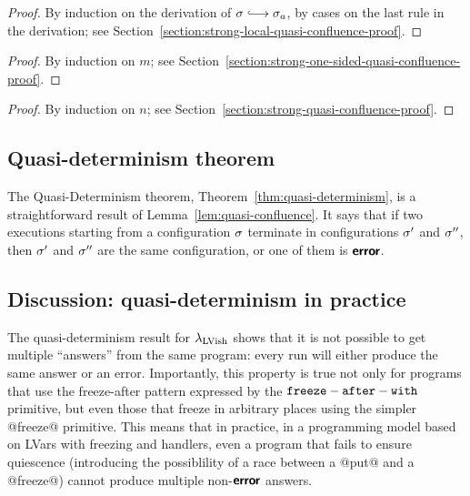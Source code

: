 \LemStrongLocalQuasiConfluence
\begin{proof}
  By induction on the derivation of $\conf \parstepsto \conf_a$, by
  cases on the last rule in the derivation; see
  Section~\ref{section:strong-local-quasi-confluence-proof}.
\end{proof}

\LemStrongOneSidedQuasiConfluence
\begin{proof}
  By induction on $m$; see
  Section~\ref{section:strong-one-sided-quasi-confluence-proof}.
\end{proof}

\LemStrongQuasiConfluence
\begin{proof}
  By induction on $n$; see
  Section~\ref{section:strong-quasi-confluence-proof}.
\end{proof}

\LemQuasiConfluence
 
\subsection{Quasi-determinism theorem}\label{subsection:quasi-quasi-determinism}

The Quasi-Determinism theorem, Theorem~\ref{thm:quasi-determinism}, is
a straightforward result of Lemma~\ref{lem:quasi-confluence}.  It says
that if two executions starting from a configuration $\sigma$ terminate
in configurations $\sigma'$ and $\sigma''$, then $\sigma'$ and $\sigma''$
are the same configuration, or one of them is $\textbf{\textsf{error}}$.

\ThmQuasiDeterminism

\subsection{Discussion: quasi-determinism in practice}


The quasi-determinism result for $\lambda_{\textrm{LVish}}$ shows that it is not
possible to get multiple ``answers'' from the same program: every run
will either produce the same answer or an error.  Importantly, this
property is true not only for programs that use the freeze-after
pattern expressed by the ${\mbox{\texttt{freeze}}-\mbox{\texttt{after}}-\mbox{\texttt{with}}}$ primitive, but even those that freeze
in arbitrary places using the simpler @freeze@ primitive.  This means
that in practice, in a programming model based on LVars with freezing
and handlers, even a program that fails to ensure quiescence
(introducing the possiblility of a race between a @put@ and a
@freeze@) cannot produce multiple non-$\textbf{\textsf{error}}$ answers.

